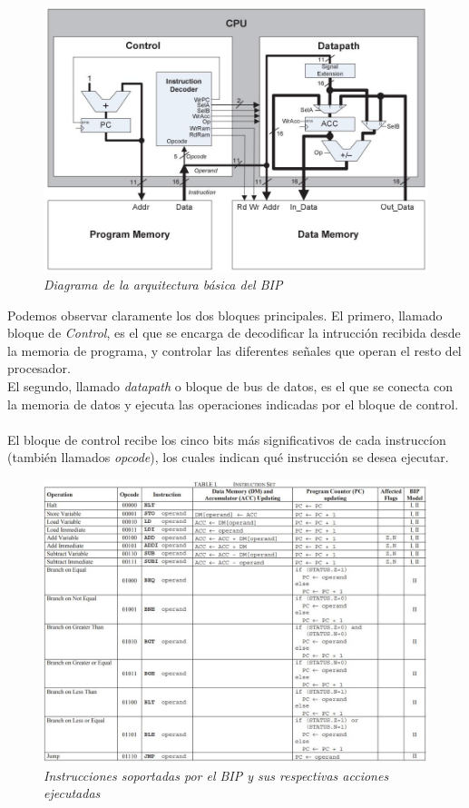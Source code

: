 \documentclass{article}
\begin{document}
\begin{figure}[H]
    \includegraphics[scale=0.5]{bip_arch}
    \caption{\textit{Diagrama de la arquitectura básica del BIP}}
\end{figure}

Podemos observar claramente los dos bloques principales.
\indent El primero, llamado bloque de \textit{Control}, es el que se encarga de decodificar
la intrucción recibida desde la memoria de programa, y controlar las diferentes señales que operan el resto
del procesador. \\
\indent El segundo, llamado \textit{datapath} o bloque de bus de datos, es el que se conecta con la memoria de datos y ejecuta las operaciones indicadas por el bloque de control. \\ \\

El bloque de control recibe los cinco bits más significativos de cada instruccíon (también llamados \textit{opcode}),
los cuales indican qué instrucción se desea ejecutar.

\begin{figure}[H]
    \includegraphics[scale=0.5]{opcodes}
    \caption{\textit{Instrucciones soportadas por el BIP y sus respectivas acciones ejecutadas}}
\end{figure}
\end{document}

